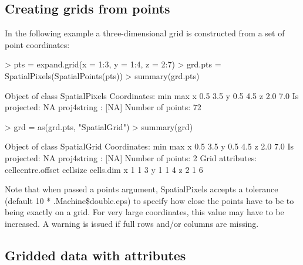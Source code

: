 \documentclass{article}
\begin{document}
\subsection{Creating grids from points}
In the following example a three-dimensional grid is constructed from
a set of point coordinates:
\begin{Schunk}
\begin{Sinput}
> pts = expand.grid(x = 1:3, y = 1:4, z = 2:7)
> grd.pts = SpatialPixels(SpatialPoints(pts))
> summary(grd.pts)
\end{Sinput}
\begin{Soutput}
Object of class SpatialPixels
Coordinates:
  min max
x 0.5 3.5
y 0.5 4.5
z 2.0 7.0
Is projected: NA 
proj4string : [NA]
Number of points: 72

\end{Soutput}
\begin{Sinput}
> grd = as(grd.pts, "SpatialGrid")
> summary(grd)
\end{Sinput}
\begin{Soutput}
Object of class SpatialGrid
Coordinates:
  min max
x 0.5 3.5
y 0.5 4.5
z 2.0 7.0
Is projected: NA 
proj4string : [NA]
Number of points: 2
Grid attributes:
  cellcentre.offset cellsize cells.dim
x                 1        1         3
y                 1        1         4
z                 2        1         6

\end{Soutput}
\end{Schunk}
Note that when passed a points argument, SpatialPixels accepts a tolerance
(default 10 * .Machine\$double.eps) to specify how close the points have
to be to being exactly on a grid. For very large coordinates, this value
may have to be increased. A warning is issued if full rows and/or columns
are missing.

\subsection{Gridded data with attributes}
\end{document}
